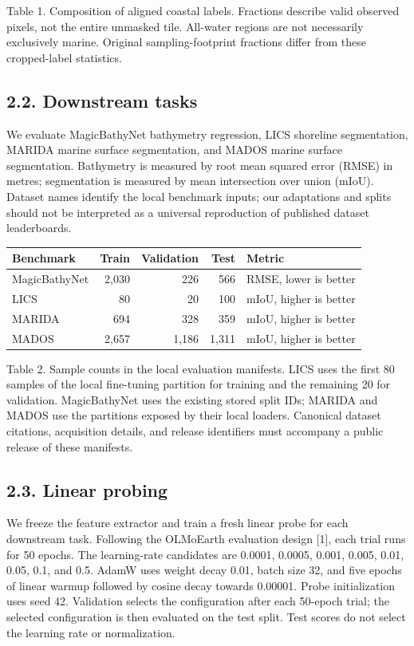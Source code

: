 \documentclass[
  10pt,
  english,
]{article}
\begin{document}
Table 1. Composition of aligned coastal labels. Fractions describe valid
observed pixels, not the entire unmasked tile. All-water regions are not
necessarily exclusively marine. Original sampling-footprint fractions
differ from these cropped-label statistics.

\hypertarget{downstream-tasks}{%
\subsection{2.2. Downstream tasks}\label{downstream-tasks}}

We evaluate MagicBathyNet bathymetry regression, LICS shoreline
segmentation, MARIDA marine surface segmentation, and MADOS marine
surface segmentation. Bathymetry is measured by root mean squared error
(RMSE) in metres; segmentation is measured by mean intersection over
union (mIoU). Dataset names identify the local benchmark inputs; our
adaptations and splits should not be interpreted as a universal
reproduction of published dataset leaderboards.

\begin{longtable}[]{@{}lrrrl@{}}
\toprule
Benchmark & Train & Validation & Test & Metric \\
\midrule
\endhead
MagicBathyNet & 2,030 & 226 & 566 & RMSE, lower is better \\
LICS & 80 & 20 & 100 & mIoU, higher is better \\
MARIDA & 694 & 328 & 359 & mIoU, higher is better \\
MADOS & 2,657 & 1,186 & 1,311 & mIoU, higher is better \\
\bottomrule
\end{longtable}

Table 2. Sample counts in the local evaluation manifests. LICS uses the
first 80 samples of the local fine-tuning partition for training and the
remaining 20 for validation. MagicBathyNet uses the existing stored
split IDs; MARIDA and MADOS use the partitions exposed by their local
loaders. Canonical dataset citations, acquisition details, and release
identifiers must accompany a public release of these manifests.

\hypertarget{linear-probing}{%
\subsection{2.3. Linear probing}\label{linear-probing}}

We freeze the feature extractor and train a fresh linear probe for each
downstream task. Following the OLMoEarth evaluation design {[}1{]}, each
trial runs for 50 epochs. The learning-rate candidates are 0.0001,
0.0005, 0.001, 0.005, 0.01, 0.05, 0.1, and 0.5. AdamW uses weight decay
0.01, batch size 32, and five epochs of linear warmup followed by cosine
decay towards 0.00001. Probe initialization uses seed 42. Validation
selects the configuration after each 50-epoch trial; the selected
configuration is then evaluated on the test split. Test scores do not
select the learning rate or normalization.
\end{document}
